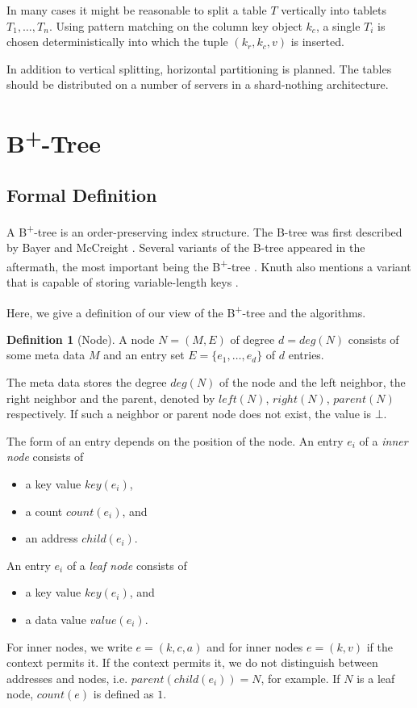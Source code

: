 \documentclass[a4paper, 9pt]{scrartcl}
\theoremstyle{plain}
\theoremstyle{definition}
\newtheorem{defi}[thm]{Definition}
\theoremstyle{remark}
\begin{document}
\begin{multicols}{2}
In many cases it might be reasonable to split a table $T$ vertically into
tablets $T_1, \ldots, T_n$. Using pattern matching on the column key object
$k_c$, a single $T_i$ is chosen deterministically into which the tuple
$(k_r, k_c, v)$ is inserted.

In addition to vertical splitting, horizontal partitioning is planned.
The tables should be distributed on a number of servers in a shard-nothing
architecture.



\section{B\textsuperscript{+}-Tree} \label{sec:btree}
\subsection{Formal Definition} \label{ssec:formal}
A B\textsuperscript{+}-tree is an order-preserving index structure.
The B-tree was first described by Bayer and McCreight \cite{Bayer}.
Several variants of the B-tree appeared in the aftermath, the most important
being the B\textsuperscript{+}-tree \cite{Cormen, KnuthBTree}.
Knuth also mentions a variant that is capable of storing variable-length
keys \cite{KnuthBTree}.

Here, we give a definition of our view of the B\textsuperscript{+}-tree and
the algorithms.

\begin{defi}[Node]
A node \mbox{$N = (M, E)$} of degree \mbox{$d = deg(N)$} consists of some
meta data $M$ and an entry set \mbox{$E = \{ e_1, \ldots, e_d \}$} of
$d$ entries.

The meta data stores the degree $deg(N)$ of the node and the left neighbor,
the right neighbor and the parent, denoted by $left(N)$, $right(N)$, $parent(N)$
respectively. If such a neighbor or parent node does not exist, the
value is $\bot$.

The form of an entry depends on the position of the node.
An entry $e_i$ of a {\em inner node} consists of
\begin{itemize}
\item a key value $key(e_i)$,
\item a count $count(e_i)$, and
\item an address $child(e_i)$.
\end{itemize}
An entry $e_i$ of a {\em leaf node} consists of
\begin{itemize}
\item a key value $key(e_i)$, and
\item a data value $value(e_i)$.
\end{itemize}
For inner nodes, we write \mbox{$e = (k, c, a)$} and for inner nodes 
\mbox{$e = (k, v)$}
if the context permits it.
If the context permits it, we do not distinguish between addresses and nodes,
i.e. \mbox{$parent(child(e_i)) = N$}, for example.
If $N$ is a leaf node, $count(e)$ is defined as $1$.
\end{defi}



\end{multicols}
\end{document}
